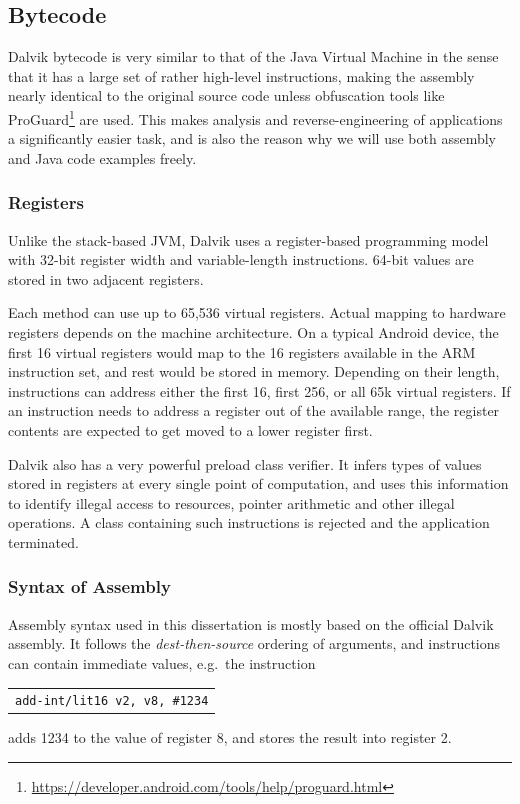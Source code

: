 \documentclass[12pt,twoside,notitlepage]{report}
\newcommand{\centerbox}[1] {
	\begin{center}
	\begin{footnotesize}
	\begin{tabular}{l}
		#1
	\end{tabular}
	\end{footnotesize}
	\end{center}
}
\newcommand{\asm}[1] {\texttt{#1}}
\begin{document}
\subsection{Bytecode}

Dalvik bytecode is very similar to that of the Java Virtual Machine in the sense that it has a large set of rather high-level instructions, making the assembly nearly identical to the original source code unless obfuscation tools like ProGuard\footnote{\scriptsize\url{https://developer.android.com/tools/help/proguard.html}} are used. This makes analysis and reverse-engineering of applications a significantly easier task, and is also the reason why we will use both assembly and Java code examples freely.

\subsubsection{Registers}

Unlike the stack-based JVM, Dalvik uses a register-based programming model with 32-bit register width and variable-length instructions. 64-bit values are stored in two adjacent registers.

Each method can use up to 65,536 virtual registers. Actual mapping to hardware registers depends on the machine architecture. On a typical Android device, the first 16 virtual registers would map to the 16 registers available in the ARM instruction set, and rest would be stored in memory. Depending on their length, instructions can address either the first 16, first 256, or all 65k virtual registers. If an instruction needs to address a register out of the available range, the register contents are expected to get moved to a lower register first.

Dalvik also has a very powerful preload class verifier. It infers types of values stored in registers at every single point of computation, and uses this information to identify illegal access to resources, pointer arithmetic and other illegal operations. A class containing such instructions is rejected and the application terminated.

\subsubsection{Syntax of Assembly}
Assembly syntax used in this dissertation is mostly based on the official Dalvik assembly. It follows the \emph{dest-then-source} ordering of arguments, and instructions can contain immediate values, e.g.\ the instruction
		\centerbox{
			\asm{add-int/lit16 v2, v8, \#1234}
		}
adds 1234 to the value of register 8, and stores the result into register 2. 
\end{document}
